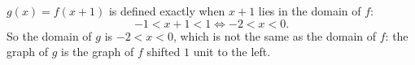 $g(x)=f(x+1)$ is defined exactly when $x+1$ lies in the domain of $f$:
\[-1<x+1<1\iff-2<x<0 .\]
So the domain of $g$ is $\boxed{-2<x<0}$, which is not the same as the domain of $f$: the graph of $g$ is the graph of $f$ shifted $1$ unit to the left.
